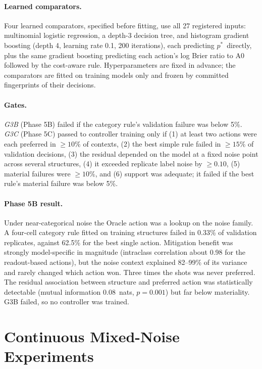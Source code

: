 \documentclass[11pt]{article}
\newcommand{\pstar}{$p^{*}$}
\begin{document}
\paragraph{Learned comparators.}
Four learned comparators, specified before fitting, use all 27 registered inputs: multinomial logistic regression, a depth-3 decision tree, and histogram gradient boosting (depth 4, learning rate 0.1, 200 iterations), each predicting \pstar\ directly, plus the same gradient boosting predicting each action's log Brier ratio to A0 followed by the cost-aware rule.
Hyperparameters are fixed in advance; the comparators are fitted on training models only and frozen by committed fingerprints of their decisions.

\paragraph{Gates.}
\emph{G3B} (Phase 5B) failed if the category rule's validation failure was below 5\%.
\emph{G3C} (Phase 5C) passed to controller training only if (1) at least two actions were each preferred in $\ge10\%$ of contexts, (2) the best simple rule failed in $\ge15\%$ of validation decisions, (3) the residual depended on the model at a fixed noise point across several structures, (4) it exceeded replicate label noise by $\ge0.10$, (5) material failures were $\ge10\%$, and (6) support was adequate; it failed if the best rule's material failure was below 5\%.

\paragraph{Phase 5B result.}
Under near-categorical noise the Oracle action was a lookup on the noise family.
A four-cell category rule fitted on training structures failed in 0.33\% of validation replicates, against 62.5\% for the best single action.
Mitigation benefit was strongly model-specific in magnitude (intraclass correlation about 0.98 for the readout-based actions), but the noise context explained 82--99\% of its variance and rarely changed which action won.
Three times the shots was never preferred.
The residual association between structure and preferred action was statistically detectable (mutual information 0.08~nats, $p=0.001$) but far below materiality.
G3B failed, so no controller was trained.

\section{Continuous Mixed-Noise Experiments}
\label{sec:continuous}
\end{document}
